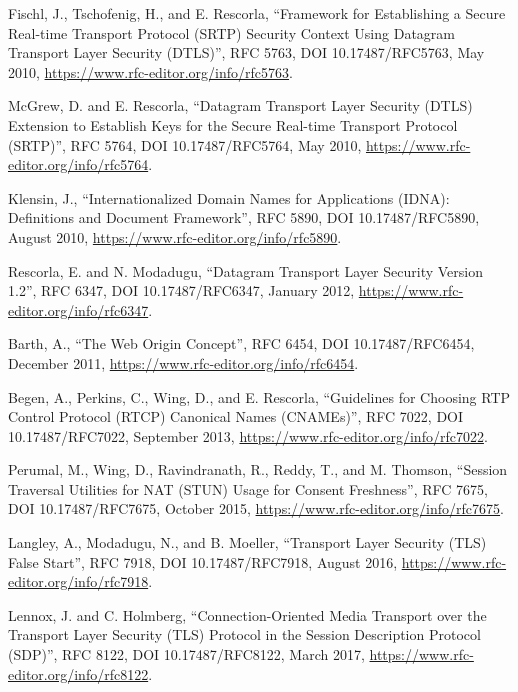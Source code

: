 \documentclass{article}
\begin{document}
\begin{description}[style=nextline, leftmargin=2cm, labelwidth=1.8cm]
\item[{[RFC5763]}] Fischl, J., Tschofenig, H., and E. Rescorla, ``Framework
  for Establishing a Secure Real-time Transport Protocol
  (SRTP) Security Context Using Datagram Transport Layer
  Security (DTLS)'', RFC 5763, DOI 10.17487/RFC5763, May
  2010, \url{https://www.rfc-editor.org/info/rfc5763}.

\item[{[RFC5764]}] McGrew, D. and E. Rescorla, ``Datagram Transport Layer
  Security (DTLS) Extension to Establish Keys for the Secure
  Real-time Transport Protocol (SRTP)'', RFC 5764,
  DOI 10.17487/RFC5764, May 2010,
  \url{https://www.rfc-editor.org/info/rfc5764}.

\item[{[RFC5890]}] Klensin, J., ``Internationalized Domain Names for
  Applications (IDNA): Definitions and Document Framework'',
  RFC 5890, DOI 10.17487/RFC5890, August 2010,
  \url{https://www.rfc-editor.org/info/rfc5890}.

\item[{[RFC6347]}] Rescorla, E. and N. Modadugu, ``Datagram Transport Layer
  Security Version 1.2'', RFC 6347, DOI 10.17487/RFC6347,
  January 2012, \url{https://www.rfc-editor.org/info/rfc6347}.

\item[{[RFC6454]}] Barth, A., ``The Web Origin Concept'', RFC 6454,
  DOI 10.17487/RFC6454, December 2011,
  \url{https://www.rfc-editor.org/info/rfc6454}.

\item[{[RFC7022]}] Begen, A., Perkins, C., Wing, D., and E. Rescorla,
  ``Guidelines for Choosing RTP Control Protocol (RTCP)
  Canonical Names (CNAMEs)'', RFC 7022, DOI 10.17487/RFC7022,
  September 2013, \url{https://www.rfc-editor.org/info/rfc7022}.

\item[{[RFC7675]}] Perumal, M., Wing, D., Ravindranath, R., Reddy, T., and M.
  Thomson, ``Session Traversal Utilities for NAT (STUN) Usage
  for Consent Freshness'', RFC 7675, DOI 10.17487/RFC7675,
  October 2015, \url{https://www.rfc-editor.org/info/rfc7675}.

\item[{[RFC7918]}] Langley, A., Modadugu, N., and B. Moeller, ``Transport
  Layer Security (TLS) False Start'', RFC 7918,
  DOI 10.17487/RFC7918, August 2016,
  \url{https://www.rfc-editor.org/info/rfc7918}.

\item[{[RFC8122]}] Lennox, J. and C. Holmberg, ``Connection-Oriented Media
  Transport over the Transport Layer Security (TLS) Protocol
  in the Session Description Protocol (SDP)'', RFC 8122,
  DOI 10.17487/RFC8122, March 2017,
  \url{https://www.rfc-editor.org/info/rfc8122}.


\end{description}
\end{document}
